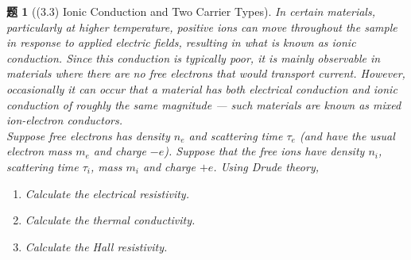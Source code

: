 \documentclass[UTF8,10pt,a4paper]{article}
\theoremstyle{Problem}
\newtheorem{prob}{题}
\theoremstyle{Solution}
\begin{document}
\begin{prob}[(3.3) Ionic Conduction and Two Carrier Types]
    In certain materials, particularly at higher temperature, positive ions can move throughout the sample in response to applied electric fields, resulting in what is known as ionic conduction. Since this conduction is typically poor, it is mainly observable in materials where there are no free electrons that would transport current. However, occasionally it can occur that a material has both electrical conduction and ionic conduction of roughly the same magnitude --- such materials are known as mixed ion-electron conductors.\\
    Suppose free electrons has density $n_e$ and scattering time $\tau_e$ (and have the usual electron mass $m_e$ and charge $-e$). Suppose that the free ions have density $n_i$, scattering time $\tau_i$, mass $m_i$ and charge $+e$. Using Drude theory,
    \begin{enumerate}
        \item[(a)] Calculate the electrical resistivity.
        \item[(b)] Calculate the thermal conductivity.
        \item[(c)$^*$] Calculate the Hall resistivity.
    \end{enumerate}
\end{prob}
\end{document}
